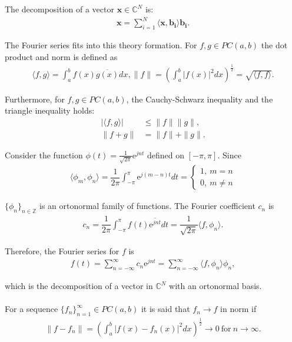 The decomposition of a vector $\textbf{x} \in \mathbb{C}^N$ is:
\begin{align*}
\textbf{x} = \sum_{i=1}^N \langle \textbf{x}, \textbf{b}_\textbf{i} \rangle \textbf{b}_\textbf{i}.
\end{align*}

The Fourier series fits into this theory formation. For
$f,g \in PC(a,b)$ the dot product and norm is defined as
\begin{align*}
\langle f,g \rangle = \int_a^b f(x) \overline{g(x)} dx,
\|f\| = \left( \int_a^b |f(x)|^2 dx \right)^{\frac{1}{2}} = \sqrt{\langle f,f \rangle}.
\end{align*}

Furthermore, for $f,g \in PC(a,b)$, the Cauchy-Schwarz inequality and the triangle inequality holds:
\begin{align*}
|\langle f,g \rangle| &\leq \|f\| \|g\|, \\
\|f+g\| &= \|f\| + \|g\|.
\end{align*}

Consider the function $\phi(t) = \frac{1}{\sqrt{2\pi}} \text{e}^{jnt}$ defined on $[-\pi,\pi]$. Since
\begin{align*}
\langle \phi_m, \phi_n \rangle = \dfrac{1}{2\pi} \int_{-\pi}^\pi \text{e}^{j(m-n)t} dt =
\begin{cases}
1, \ m = n \\
0, \ m \neq n
\end{cases}
\end{align*}

$\{\phi_n\}_{n\in\mathbb{Z}}$ is an ortonormal family of functions. The Fourier coefficient $c_n$ is
\begin{align*}
c_n = \dfrac{1}{2\pi} \int_{-\pi}^\pi f(t) \overline{\text{e}^{jnt}} dt = \dfrac{1}{\sqrt{2\pi}} \langle f,\phi_n \rangle.
\end{align*}

Therefore, the Fourier series for $f$ is
\begin{align} \label{eq:ort_fam}
f(t) = \sum_{n=-\infty}^\infty c_n \text{e}^{jnt} = \sum_{n=-\infty}^\infty \langle f, \phi_n \rangle \phi_n,
\end{align}

which is the decomposition of a vector in $\mathbb{C}^N$ with an ortonormal basis.
\\ \\
For a sequence $\{f_n\}_{n=1}^\infty \in PC(a,b)$ it is said that $f_n \to f$ in norm if
\begin{align*}
\|f - f_n\| = \left( \int_a^b |f(x) - f_n(x)|^2  dx \right)^\frac{1}{2} \to 0 \ \text{for} \ n \to \infty.
\end{align*}

